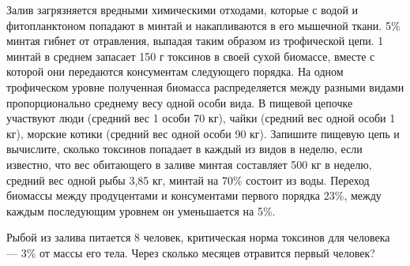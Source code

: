 
Залив загрязняется вредными химическими отходами, которые с водой и фитопланктоном попадают в минтай и 
накапливаются в его мышечной ткани. 5\% минтая гибнет от отравления, выпадая таким образом из трофической цепи. 
1 минтай в среднем запасает 150 г токсинов в своей сухой биомассе, вместе с которой они передаются консументам 
следующего порядка. На одном трофическом уровне полученная биомасса распределяется между разными видами 
пропорционально среднему весу одной особи вида. В пищевой цепочке участвуют люди (средний вес 1 особи 70 кг), 
чайки (средний вес одной особи 1 кг), морские котики (средний вес одной особи 90 кг). Запишите пищевую цепь и 
вычислите, сколько токсинов попадает в каждый из видов в неделю, если известно, что вес обитающего в заливе минтая 
составляет 500 кг в неделю, средний вес одной рыбы 3,85 кг, минтай на 70\% состоит из воды. Переход биомассы между 
продуцентами и консументами первого порядка 23\%, между каждым последующим уровнем он уменьшается на 5\%.

Рыбой из залива питается 8 человек, критическая норма токсинов для человека — 3\% от массы его тела. Через 
сколько месяцев отравится первый человек?
